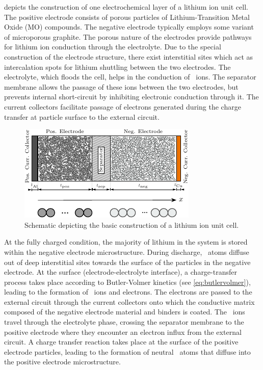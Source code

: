  depicts the construction of one electrochemical
layer of a lithium ion unit cell. The positive electrode consists of porous
particles of  Lithium-Transition  Metal  Oxide  (MO)  compounds.  The  negative
electrode typically employs some variant of microporous graphite. The porous
nature of the electrodes provide pathways for lithium  ion conduction through
the electrolyte. Due  to  the  special  construction  of the  electrode
structure,  there  exist interstitial  sites  which act  as  intercalation
spots for  lithium  shuttling between the two electrodes. The electrolyte, which
floods the cell, helps in the conduction of ~ions. The separator
membrane allows the passage of these ions  between  the  two  electrodes,  but
prevents  internal  short-circuit  by inhibiting electronic  conduction through
it. The  current collectors facilitate passage of electrons generated during the
charge transfer at particle surface to the external circuit.

\begin{figure}[!htbp]
    \centering
    \includegraphics[width=\textwidth]{cropped_cell_sandwich_for_thesis}
    \caption[Illustration of a lithium ion unit cell]{Schematic depicting the
    basic construction of a lithium ion unit cell.}
    \label{fig:chargetransferprocess}
\end{figure}

At the fully charged condition, the majority  of lithium in the system is stored
within the negative electrode  microstructure. During discharge, ~atoms
diffuse out of  deep interstitial sites towards the surface  of the particles in
the  negative  electrode.  At  the  surface  (electrode-electrolyte  interface),
a  charge-transfer  process  takes  place according  to  Butler-Volmer  kinetics
(see  \cref{eq:butlervolmer}), leading  to the  formation of  ~ions and
electrons. The electrons are passed to  the external circuit through the 
current collectors  onto which  the conductive matrix  composed of  the negative
electrode material and binders is  coated. The ~ions travel through the
electrolyte phase,  crossing the  separator membrane  to the  positive electrode
where they  encounter an  electron influx  from the  external circuit.  A charge
transfer  reaction  takes  place  at  the  surface  of  the  positive  electrode
particles, leading to the formation of neutral ~atoms that diffuse into
the positive electrode microstructure.

